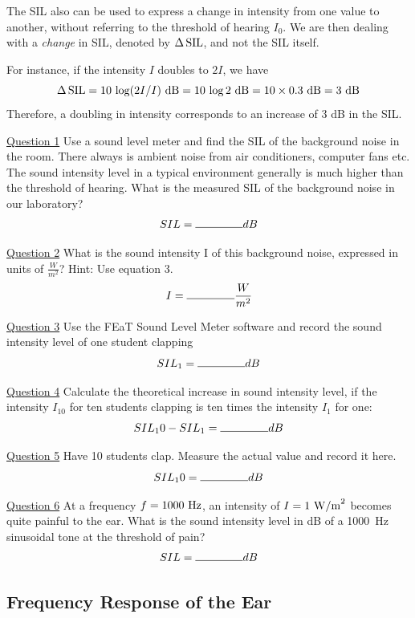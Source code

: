 \documentclass[11pt]{NSF}
\def\be{\begin{equation}}
\def\ee{\end{equation}}
\begin{document}
The SIL also can be used to express a change in intensity from one 
value to another, without referring to the threshold of hearing $I_0$. 
We are then dealing with a {\em change} in SIL, denoted by 
$\Delta\,{\rm SIL}$, and not the SIL itself. 

For instance, if the intensity $I$ doubles to $2I$, we have
%
\be
\Delta\,{\rm SIL} = 10\,\log (2I/I)~{\rm dB}
= 10\,\log 2~{\rm dB} 
= 10\times 0.3~{\rm dB} 
= 3~{\rm dB}
\ee
Therefore, a doubling in intensity corresponds to an increase of 3 dB in the SIL.


\underline{Question 1} Use a sound level meter and find the SIL of the background noise in the room. There always is
ambient noise from air conditioners, computer fans etc. The sound intensity level in a typical
environment generally is much higher than the threshold of hearing. What is the measured SIL of
the background noise in our laboratory? 
\[ SIL=\rule{1.5cm}{0.15mm}dB\]

\underline{Question 2} What is the sound intensity I of this background noise, expressed in units of $\frac{W}{m^2}$? Hint: Use equation 3.
\[I=\rule{1.5cm}{0.15mm}\frac{W}{m^2}\]

\underline{Question 3} Use the FEaT Sound Level Meter software and record the sound intensity level of one student
clapping
\[ SIL_1=\rule{1.5cm}{0.15mm}dB\]

\underline{Question 4} Calculate the theoretical increase in sound intensity level, if the intensity $I_10$ for ten students
clapping is ten times the intensity $I_1$ for one:
\[ SIL_10 - SIL_1=\rule{1.5cm}{0.15mm}dB\]

\underline{Question 5} Have 10 students clap. Measure the actual value and record it here.
\[ SIL_10=\rule{1.5cm}{0.15mm}dB\]

\underline{Question 6} At a frequency $f =1000~{\rm Hz}$, an intensity of $I = 1~{\rm W/m}^2$ 
becomes quite painful to the ear.
What is the sound intensity level in dB of a 1000~Hz sinusoidal 
tone at the threshold of pain?
\[ SIL=\rule{1.5cm}{0.15mm}dB\]




\subsection{Frequency Response of the Ear}
\end{document}
